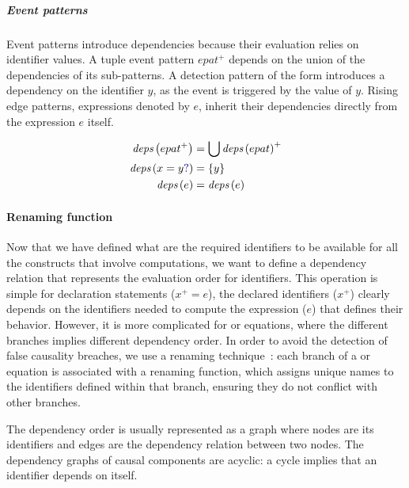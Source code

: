 \subparagraph{Event patterns}

Event patterns introduce dependencies because their evaluation relies on identifier values.
%
A tuple event pattern $epat^+$ depends on the union of the dependencies of its sub-patterns.
%
A detection pattern of the form  introduces a dependency on the identifier $y$, as the event
is triggered by the value of $y$.
%
Rising edge patterns, expressions denoted by $e$, inherit their dependencies directly from the
expression $e$ itself.

\begin{align}
    \deps{epat^+}        & = \bigcup \deps{epat}^+ \label{rule:semantics:grsync:causality:dependencies:deps:epat} \\
    \deps{\detect{x}{y}} & = \{y\} \label{rule:semantics:grsync:causality:dependencies:deps:epat:event}           \\
    \deps{e}             & = \deps{e} \label{rule:semantics:grsync:causality:dependencies:deps:epat:edge}
\end{align}

\paragraph{Renaming function}
\label{sec:semantics:grsync:causality:dependencies:renaming}

Now that we have defined what are the required identifiers to be available for all the \GRSync
constructs that involve computations, we want to define a dependency relation that represents the
evaluation order for identifiers.
%
This operation is simple for declaration statements ($x^+ = e$), the declared identifiers ($x^+$)
clearly depends on the identifiers needed to compute the expression ($e$) that defines their
behavior. However, it is more complicated for  or  equations, where the
different branches implies different dependency order. In order to avoid the detection of false
causality breaches, we use a renaming technique~\cite{bourke:hal-03936656}: each branch of a
 or  equation is associated with a renaming function, which assigns unique
names to the identifiers defined within that branch, ensuring they do not conflict with other
branches.

The dependency order is usually represented as a graph where nodes are its identifiers and edges are
the dependency relation between two nodes. The dependency graphs of causal components are acyclic:
a cycle implies that an identifier depends on itself.

